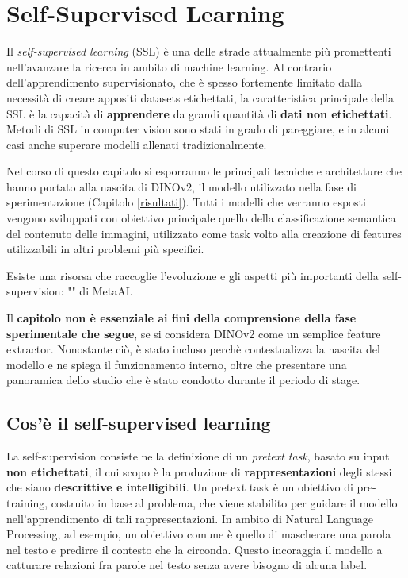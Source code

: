 \chapter{Self-Supervised Learning}
\label{ssl}

Il \textit{self-supervised learning} (SSL) è una delle strade attualmente più promettenti nell'avanzare la ricerca in ambito di machine learning. Al contrario dell'apprendimento supervisionato, che è spesso fortemente limitato dalla necessità di creare appositi datasets etichettati, la caratteristica principale della SSL è la capacità di \textbf{apprendere} da grandi quantità di \textbf{dati non etichettati}.
Metodi di SSL in computer vision sono stati in grado di pareggiare, e in alcuni casi anche superare modelli allenati tradizionalmente.

Nel corso di questo capitolo si esporranno le principali tecniche e architetture che hanno portato alla nascita di DINOv2, il modello utilizzato nella fase di sperimentazione (Capitolo \ref{risultati}). Tutti i modelli che verranno esposti vengono sviluppati con obiettivo principale quello della classificazione semantica del contenuto delle immagini, utilizzato come task volto alla creazione di features utilizzabili in altri problemi più specifici.

Esiste una risorsa che raccoglie l'evoluzione e gli aspetti più importanti della self-supervision: "\textit{}" \cite{cookbook} di MetaAI. 

Il \textbf{capitolo non è essenziale ai fini della comprensione della fase sperimentale che segue}, se si considera DINOv2 come un semplice feature extractor. Nonostante ciò, è stato incluso perchè contestualizza la nascita del modello e ne spiega il funzionamento interno, oltre che presentare una panoramica dello studio che è stato condotto durante il periodo di stage.

\section{Cos'è il self-supervised learning}
La self-supervision consiste nella definizione di un \textit{pretext task}, basato su input \textbf{non etichettati}, il cui scopo è la produzione di \textbf{rappresentazioni} degli stessi che siano \textbf{descrittive e intelligibili}. Un pretext task è un obiettivo di pre-training, costruito in base al problema, che viene stabilito per guidare il modello nell'apprendimento di tali rappresentazioni. In ambito di Natural Language Processing, ad esempio, un obiettivo comune è quello di mascherare una parola nel testo e predirre il contesto che la circonda. Questo incoraggia il modello a catturare relazioni fra parole nel testo senza avere bisogno di alcuna label.

